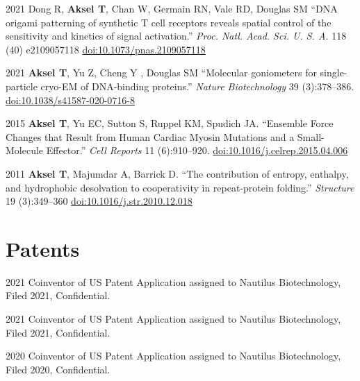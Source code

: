 \documentclass[12pt,letterpaper]{report}
\begin{document}
    \begin{tablist}

        \item[2021] \tab{}Dong R, \textbf{Aksel T}, Chan W, Germain RN, Vale RD, Douglas SM \enquote{DNA origami patterning of synthetic T cell receptors reveals spatial control of the sensitivity and kinetics of signal activation.} \textit{Proc. Natl. Acad. Sci. U. S. A.} 118 (40) e2109057118 \href{https://doi.org/10.1073/pnas.2109057118}{doi:10.1073/pnas.2109057118}

        \item[2021] \tab{}\textbf{Aksel T}, Yu Z, Cheng Y , Douglas SM \enquote{Molecular goniometers for single-particle cryo-EM of DNA-binding proteins.} \textit{Nature Biotechnology} 39 (3):378--386. \href{https://doi.org/10.1038/s41587-020-0716-8}{doi:10.1038/s41587-020-0716-8}

        \item[2015] \tab{}\textbf{Aksel T}, Yu EC, Sutton S, Ruppel KM, Spudich JA. \enquote{Ensemble Force Changes that Result from Human Cardiac Myosin Mutations and a Small-Molecule Effector.} \textit{Cell Reports} 11 (6):910--920. \href{https://doi.org/10.1016/j.celrep.2015.04.006}{doi:10.1016/j.celrep.2015.04.006}

        \item[2011] \tab{}\textbf{Aksel T}, Majumdar A, Barrick D. \enquote{The contribution of entropy, enthalpy, and hydrophobic desolvation to cooperativity in repeat-protein folding.} \textit{Structure} 19 (3):349--360 \href{https://doi.org/10.1016/j.str.2010.12.018}{doi:10.1016/j.str.2010.12.018}

    \end{tablist}
    
    \section*{Patents}

    \begin{tablist}

        \item[2021] \tab{}Coinventor of US Patent Application assigned to Nautilus Biotechnology, Filed 2021, Confidential.
        \item[2021] \tab{}Coinventor of US Patent Application assigned to Nautilus Biotechnology, Filed 2021, Confidential.
        \item[2020] \tab{}Coinventor of US Patent Application assigned to Nautilus Biotechnology, Filed 2020, Confidential.

    \end{tablist}
\end{document}
